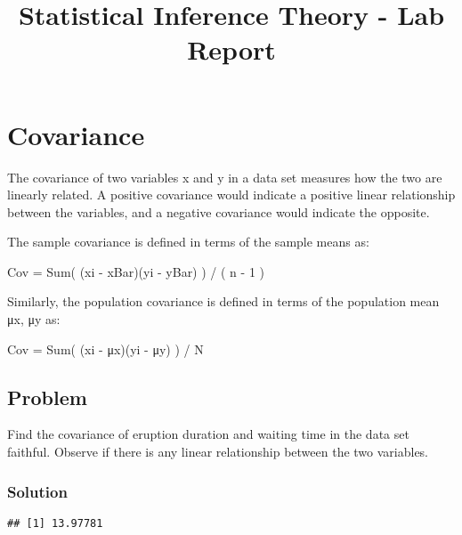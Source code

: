 \documentclass[
]{article}
\title{Statistical Inference Theory - Lab Report}
\author{}
\date{\vspace{-2.5em}}
\newenvironment{Shaded}{\begin{snugshade}}{\end{snugshade}}
\newcommand{\FunctionTok}[1]{\textcolor[rgb]{0.00,0.00,0.00}{#1}}
\newcommand{\NormalTok}[1]{#1}
\newcommand{\OtherTok}[1]{\textcolor[rgb]{0.56,0.35,0.01}{#1}}
\newcommand{\SpecialCharTok}[1]{\textcolor[rgb]{0.00,0.00,0.00}{#1}}
\begin{document}
\maketitle

\hypertarget{covariance}{%
\section{Covariance}\label{covariance}}

The covariance of two variables x and y in a data set measures how the
two are linearly related. A positive covariance would indicate a
positive linear relationship between the variables, and a negative
covariance would indicate the opposite.

The sample covariance is defined in terms of the sample means as:

Cov = Sum( (xi - xBar)(yi - yBar) ) / ( n - 1 )

Similarly, the population covariance is defined in terms of the
population mean μx, μy as:

Cov = Sum( (xi - μx)(yi - μy) ) / N

\hypertarget{problem}{%
\subsection{Problem}\label{problem}}

Find the covariance of eruption duration and waiting time in the data
set faithful. Observe if there is any linear relationship between the
two variables.

\hypertarget{solution}{%
\subsubsection{Solution}\label{solution}}

\begin{Shaded}
\end{Shaded}

\begin{verbatim}
## [1] 13.97781
\end{verbatim}
\end{document}
